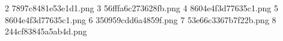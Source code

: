 2 7897c8481e53e1d1.png
3 56fffa6c273628fb.png
4 8604e4f3d77635c1.png
5 8604e4f3d77635c1.png
6 350959cdd6a4859f.png
7 53e66c3367b7f22b.png
8 244cf83845a5ab4d.png
